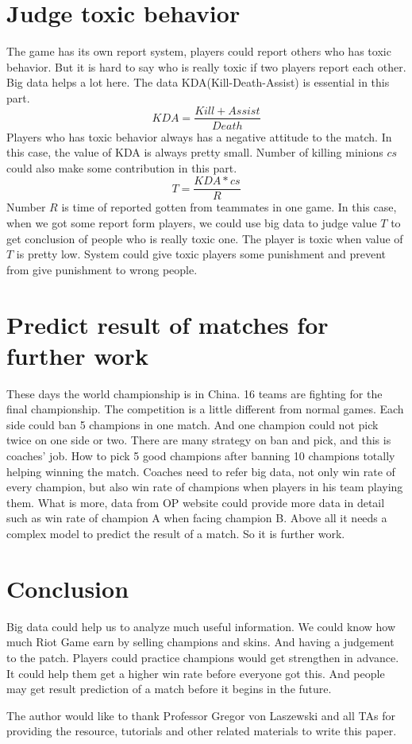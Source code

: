 \documentclass[sigconf]{acmart}
\begin{document}
\section{Judge toxic behavior}
The game has its own report system, players could report others who has toxic behavior. But it is hard to say who is really toxic if two players report each other. Big data helps a lot here. The data KDA(Kill-Death-Assist) is essential in this part. \\
\begin{equation}
    KDA=\frac{Kill + Assist}{Death}
\end{equation}
Players who has toxic behavior always has a negative attitude to the match. In this case, the value of KDA is always pretty small. Number of killing minions $cs$ could also make some contribution in this part. \\
\begin{equation}
    T=\frac{KDA*cs}{R}
\end{equation}
Number $R$ is time of reported gotten from teammates in one game. In this case, when we got some report form players, we could use big data to judge value $T$ to get conclusion of people who is really toxic one. The player is toxic when value of $T$ is pretty low. System could give toxic players some punishment and prevent from give punishment to wrong people. 
\section{Predict result of matches for further work}
These days the world championship is in China. 16 teams are fighting for the final championship. The competition is a little different from normal games. Each side could ban 5 champions in one match. And one champion could not pick twice on one side or two. There are many strategy on ban and pick, and this is coaches' job. How to pick 5 good champions after banning 10 champions totally helping winning the match. Coaches need to refer big data, not only win rate of every champion, but also win rate of champions when players in his team playing them. What is more, data from OP website could provide more data in detail such as win rate of champion A when facing champion B. Above all it needs a complex model to predict the result of a match. So it is further work. 
\section{Conclusion}
Big data could help us to analyze much useful information. We could know how much Riot Game earn by selling champions and skins. And having a judgement to the patch. Players could practice champions would get strengthen in advance. It could help them get a higher win rate before everyone got this. And people may get result prediction of a match before it begins in the future. 
\begin{acks}

The author would like to thank Professor Gregor von Laszewski and all TAs for providing the resource, tutorials and other related materials to write this paper.

\end{acks}
\end{document}

